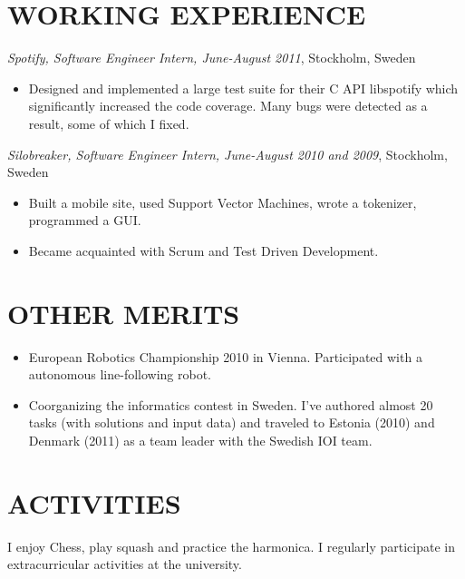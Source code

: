 \documentclass[11pt]{res} %
\begin{document}
\begin{resume}
\section{WORKING EXPERIENCE}
\emph{Spotify, Software Engineer Intern, June-August 2011}, Stockholm, Sweden
\vspace{0.2in}
   \begin{itemize} %
   \item Designed and implemented a large test suite for their C API libspotify
   which significantly increased the code coverage. Many bugs were detected as
   a result, some of which I fixed.

 \end{itemize}


\emph{Silobreaker, Software Engineer Intern, June-August 2010 and 2009}, Stockholm, Sweden
\vspace{0.2in}
 \begin{itemize} %
  \item Built a mobile site, used Support Vector Machines, wrote a tokenizer,
   programmed a GUI.
  \item Became acquainted with Scrum and Test Driven Development.
\end{itemize}

\section{OTHER MERITS}

   \begin{itemize} %
   \item European Robotics Championship 2010 in Vienna.
    Participated with a autonomous line-following robot.
   \item Coorganizing the informatics contest in Sweden.
    I've authored almost 20 tasks (with solutions and input data)
    and traveled to Estonia (2010) and Denmark (2011) as a team leader
    with the Swedish IOI team.
 \end{itemize}

\section{ACTIVITIES}

I enjoy Chess, play squash and practice the harmonica.
I regularly participate in extracurricular
activities at the university.


\end{resume}
\end{document}
